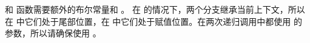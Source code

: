 \documentclass[11pt]{book}
\begin{document}
  和  函数需要额外的布尔常量和  。
%
在  的情况下，两个分支继承当前上下文，所以在  中它们处于尾部位置，在
 中它们处于赋值位置。在两次递归调用中都使用  的
 参数，所以请确保使用  。



\end{document}
